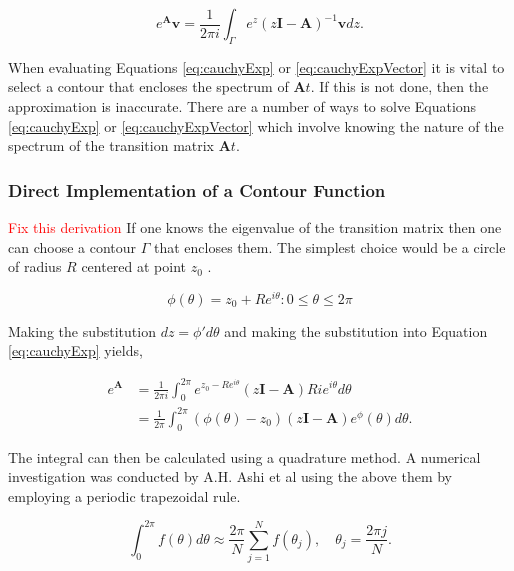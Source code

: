 \begin{equation}
	e^{\boldsymbol{A}}\boldsymbol{v} = \frac{1}{2\pi i}\int_{\Gamma} e^{z}(z\boldsymbol{I} - \boldsymbol{A})^{-1}\boldsymbol{v}dz.
	\label{eq:cauchyExpVector}
\end{equation}

\noindent When evaluating Equations \ref{eq:cauchyExp} or \ref{eq:cauchyExpVector} it is vital to select a contour that encloses the spectrum of $\boldsymbol{A}t$. If this is not done, then the approximation is inaccurate. There are a number of ways to solve Equations \ref{eq:cauchyExp} or \ref{eq:cauchyExpVector} which involve knowing the nature of the spectrum of the transition matrix $\boldsymbol{A}t$. 

\subsubsection{Direct Implementation of a Contour Function}
\textcolor{red}{Fix this derivation} If one knows the eigenvalue of the transition matrix then one can choose a contour $\Gamma$ that encloses them. The simplest choice would be a circle of radius $R$ centered at point $z_{0}$ \cite{ash2009}.

\begin{equation}
    \phi(\theta) = z_{0} + Re^{i\theta}: 0 \leq \theta \leq 2\pi 
\end{equation}

\noindent Making the substitution $dz = \phi' d\theta$ and making the substitution into Equation \ref{eq:cauchyExp} yields,

\begin{equation}
\begin{split}
    e^{\boldsymbol{A}} 
    & = \frac{1}{2\pi i}\int_{0}^{2\pi} e^{z_{0}-Re^{i\theta}}(z\boldsymbol{I}-\boldsymbol{A})Rie^{i\theta}d\theta \\[3ex]
    & = \frac{1}{2\pi}\int_{0}^{2\pi}(\phi(\theta)-z_{0})(z\boldsymbol{I}-\boldsymbol{A})e^\phi(\theta)d\theta.
\end{split}
\end{equation}

\noindent The integral can then be calculated using a quadrature method. A numerical investigation was conducted by A.H. Ashi et al \cite{ash2009} using the above them by employing a periodic trapezoidal rule. 

\begin{equation*}
    \int_{0}^{2\pi}f(\theta)d\theta \approx \frac{2\pi}{N}\sum_{j=1}^{N}f(\theta_{j}), \quad \theta_{j} = \frac{2\pi j}{N}.
\end{equation*}

